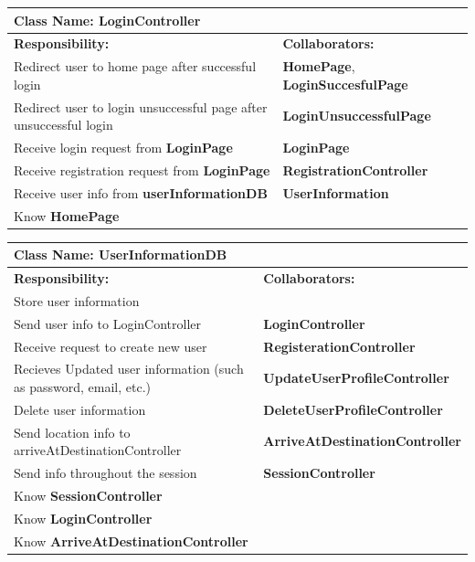 \documentclass[]{article}
\begin{document}
     \begin{table}[H]
        \centering
        \begin{tabular}{|p{5cm}|p{5cm}|}
        \hline 
         \multicolumn{2}{|l|}{\textbf{Class Name:} LoginController} \\
        \hline
        \textbf{Responsibility:} & \textbf{Collaborators:} \\
        \hline
        Redirect user to home page after successful login & \textbf{HomePage},  \textbf{LoginSuccesfulPage}  \\
        \hline
       Redirect user to login unsuccessful page after unsuccessful login & \textbf{LoginUnsuccessfulPage} \\
        \hline
        Receive login request from \textbf{LoginPage} & \textbf{LoginPage}\\
        \hline
        Receive registration request from \textbf{LoginPage} & \textbf{RegistrationController} \\
        \hline
        Receive user info from \textbf{userInformationDB} & \textbf{UserInformation} \\
        \hline
        Know \textbf{HomePage} & \phantom{} \\
        \hline
        
        \end{tabular}
    \end{table}


     \begin{table}[H]
        \centering
        \begin{tabular}{|p{5cm}|p{5cm}|}
        \hline 
         \multicolumn{2}{|l|}{\textbf{Class Name:} UserInformationDB} \\
        \hline
        \textbf{Responsibility:} & \textbf{Collaborators:} \\
        \hline
        Store user information &  \phantom{} \\
        \hline
        Send user info to LoginController &  \textbf{LoginController}\\
        \hline
        Receive request to create new user & \textbf{RegisterationController}\\
        \hline
        Recieves Updated user information (such as password, email, etc.) &  \textbf{UpdateUserProfileController}\\
        \hline
         Delete user information &  \textbf{DeleteUserProfileController}\\
         \hline
         Send location info to arriveAtDestinationController & \textbf{ArriveAtDestinationController}\\
         \hline
         Send info throughout the session & \textbf{SessionController}\\
         \hline
         Know \textbf{SessionController} & \phantom{} \\
        \hline
         Know \textbf{LoginController} & \phantom{} \\
        \hline
         Know \textbf{ArriveAtDestinationController} & \phantom{} \\
        \hline
        \end{tabular}
    \end{table}
\end{document}
